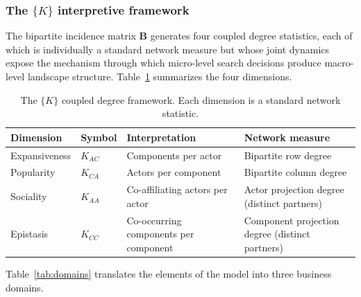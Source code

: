 \documentclass[
  article]{jss}
\begin{document}
\subsubsection[The {K} interpretive framework]{The $\{K\}$ interpretive framework}\label{sec:k4}

The bipartite incidence matrix \(\mathbf{B}\) generates four coupled
degree statistics, each of which is individually a standard network
measure but whose joint dynamics expose the mechanism through which
micro-level search decisions produce macro-level landscape structure.
Table~\ref{tab:k4} summarizes the four dimensions.

\begin{table}[t]
\centering
\small
\begin{tabular}{llp{3.6cm}p{3.6cm}}
\toprule
Dimension & Symbol & Interpretation & Network measure \\
\midrule
Expansiveness & $K_{AC}$ & Components per actor & Bipartite row degree \\
Popularity & $K_{CA}$ & Actors per component & Bipartite column degree \\
Sociality & $K_{AA}$ & Co-affiliating actors per actor & Actor projection degree (distinct partners) \\
Epistasis & $K_{CC}$ & Co-occurring components per component & Component projection degree (distinct partners) \\
\bottomrule
\end{tabular}
\caption{The $\{K\}$ coupled degree framework.  Each dimension is a standard
network statistic.}
\label{tab:k4}
\end{table}

Table~\ref{tab:domains} translates the elements of the model into three
business domains.
\end{document}
